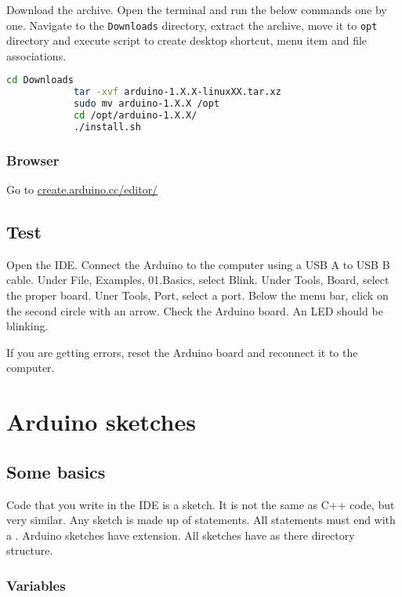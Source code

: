 \documentclass{article}
\begin{document}
			Download the  archive. Open the terminal and run the below commands one by one\@. Navigate to the \texttt{Downloads} directory, extract the archive, move it to \texttt{opt} directory and execute script to create desktop shortcut, menu item and file associations.

			\begin{lstlisting}[language=bash]
			cd Downloads
			tar -xvf arduino-1.X.X-linuxXX.tar.xz
			sudo mv arduino-1.X.X /opt
			cd /opt/arduino-1.X.X/
			./install.sh
			\end{lstlisting}

		\subsubsection{Browser}
			Go to \url{create.arduino.cc/editor/}

	\subsection{Test}

		Open the IDE\@. Connect the Arduino to the computer using a USB A to USB B cable. Under File, Examples, 01.Basics, select Blink. Under Tools, Board, select the proper board. Uner Tools, Port, select a port. Below the menu bar, click on the second circle with an arrow. Check the Arduino board. An LED should be blinking.

		If you are getting errors, reset the Arduino board and reconnect it to the computer.

\section{Arduino sketches}

	\subsection{Some basics}

		Code that you write in the IDE is a sketch. It is not the same as C++ code, but very similar. Any sketch is made up of statements. All statements must end with a \inlncd{;}. Arduino sketches have  extension. All sketches have  as there directory structure.
	
		\subsubsection{Variables}
\end{document}
